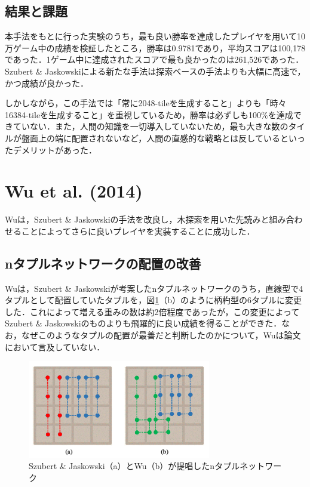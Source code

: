 \documentclass{suribt}
\begin{document}
\subsection{結果と課題}
本手法をもとに行った実験のうち，最も良い勝率を達成したプレイヤを用いて10万ゲーム中の成績を検証したところ，勝率は0.9781であり，平均スコアは100,178であった．1ゲーム中に達成されたスコアで最も良かったのは261,526であった．Szubert \& Jaskowskiによる新たな手法は探索ベースの手法よりも大幅に高速で，かつ成績が良かった．

しかしながら，この手法では「常に2048-tileを生成すること」よりも「時々16384-tileを生成すること」を重視しているため，勝率は必ずしも100\%を達成できていない．また，人間の知識を一切導入していないため，最も大きな数のタイルが盤面上の端に配置されないなど，人間の直感的な戦略とは反しているといったデメリットがあった．

\section{Wu et al. (2014)}
Wuは，Szubert \& Jaskowskiの手法を改良し，木探索を用いた先読みと組み合わせることによってさらに良いプレイヤを実装することに成功した．

\subsection{nタプルネットワークの配置の改善}
Wuは，Szubert \& Jaskowskiが考案したnタプルネットワークのうち，直線型で4タプルとして配置していたタプルを，図\ref{figure_002}（b）のように柄杓型の6タプルに変更した．これによって増える重みの数は約2倍程度であったが，この変更によってSzubert \& Jaskowskiのものよりも飛躍的に良い成績を得ることができた．なお，なぜこのようなタプルの配置が最善だと判断したのかについて，Wuは論文において言及していない．

\begin{figure}[t]
	\begin{center}
	\includegraphics[width=8cm]{figure_002.png}
	\caption{Szubert \& Jaskowski（a）とWu（b）が提唱したnタプルネットワーク}
	\label{figure_002}
	\end{center}
\end{figure}
\end{document}
